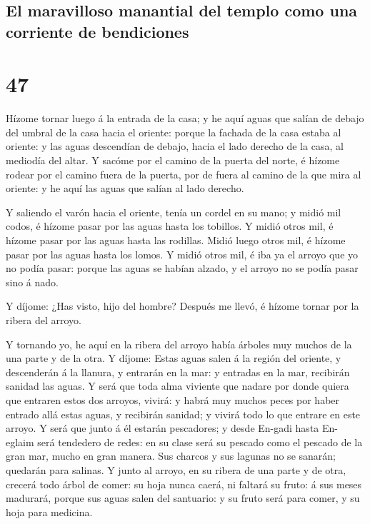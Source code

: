 \hypertarget{el-maravilloso-manantial-del-templo-como-una-corriente-de-bendiciones}{%
\subsection{El maravilloso manantial del templo como una corriente de
bendiciones}\label{el-maravilloso-manantial-del-templo-como-una-corriente-de-bendiciones}}

\hypertarget{section-46}{%
\section{47}\label{section-46}}

 Hízome tornar luego á la entrada de la casa; y he aquí
aguas que salían de debajo del umbral de la casa hacia el oriente:
porque la fachada de la casa estaba al oriente: y las aguas descendían
de debajo, hacia el lado derecho de la casa, al mediodía del altar.
 Y sacóme por el camino de la puerta del norte, é hízome
rodear por el camino fuera de la puerta, por de fuera al camino de la
que mira al oriente: y he aquí las aguas que salían al lado derecho.

 Y saliendo el varón hacia el oriente, tenía un cordel en su
mano; y midió mil codos, é hízome pasar por las aguas hasta los
tobillos.  Y midió otros mil, é hízome pasar por las aguas
hasta las rodillas. Midió luego otros mil, é hízome pasar por las aguas
hasta los lomos.  Y midió otros mil, é iba ya el arroyo que
yo no podía pasar: porque las aguas se habían alzado, y el arroyo no se
podía pasar sino á nado.

 Y díjome: ¿Has visto, hijo del hombre? Después me llevó, é
hízome tornar por la ribera del arroyo.

 Y tornando yo, he aquí en la ribera del arroyo había
árboles muy muchos de la una parte y de la otra.  Y díjome:
Estas aguas salen á la región del oriente, y descenderán á la llanura, y
entrarán en la mar: y entradas en la mar, recibirán sanidad las aguas.
 Y será que toda alma viviente que nadare por donde quiera
que entraren estos dos arroyos, vivirá: y habrá muy muchos peces por
haber entrado allá estas aguas, y recibirán sanidad; y vivirá todo lo
que entrare en este arroyo.  Y será que junto á él estarán
pescadores; y desde En-gadi hasta En-eglaim será tendedero de redes: en
su clase será su pescado como el pescado de la gran mar, mucho en gran
manera.  Sus charcos y sus lagunas no se sanarán; quedarán
para salinas.  Y junto al arroyo, en su ribera de una parte
y de otra, crecerá todo árbol de comer: su hoja nunca caerá, ni faltará
su fruto: á sus meses madurará, porque sus aguas salen del santuario: y
su fruto será para comer, y su hoja para medicina.

